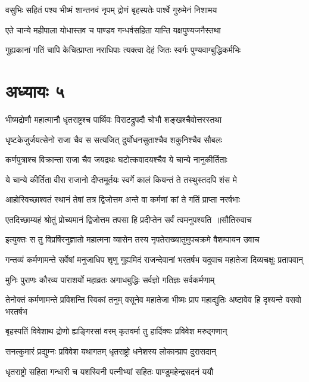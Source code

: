 \twolineshloka
{वसुभिः सहितं पश्य भीष्मं शान्तनवं नृपम्}
{द्रोणं बृहस्पतेः पार्श्वे गुरुमेनं निशामय}


\twolineshloka
{एते चान्ये महीपाला योधास्तव च पाण्डव}
{गन्धर्वसहिता यान्ति यक्षपुण्यजनैस्तथा}


\twolineshloka
{गुह्यकानां गतिं चापि केचित्प्राप्ता नराधिपाः}
{त्यक्त्वा देहं जितः स्वर्गः पुण्यवाग्बुद्धिकर्मभिः}


\chapter{अध्यायः ५}
\twolineshloka
{भीष्मद्रोणौ महात्मानौ धृतराष्ट्रश्च पार्थिवः}
{विराटद्रुपदौ चोभौ शङ्खश्चैवोत्तरस्तथा}


\twolineshloka
{धृष्टकेजुर्जयत्सेनो राजा चैव स सत्यजित्}
{दुर्योधनसुताश्चैव शकुनिश्चैव सौबलः}


\twolineshloka
{कर्णपुत्राश्च विक्रान्ता राजा चैव जयद्रथः}
{घटोत्कवादयश्चैव ये चान्ये नानुकीर्तिताः}


\twolineshloka
{ये चान्ये कीर्तिता वीरा राजानो दीप्तमूर्तयः}
{स्वर्गे कालं कियन्तं ते तस्थुस्तदपि शंस मे}


\twolineshloka
{आहोस्विच्छाश्वतं स्थानं तेषां तत्र द्विजोत्तम}
{अन्ते वा कर्मणां कां ते गतिं प्राप्ता नरर्षभाः}


\threelineshloka
{एतदिच्छाम्यहं श्रोतुं प्रोच्यमानं द्विजोत्तम}
{तपसा हि प्रदीप्तेन सर्वं त्वमनुपश्यति ॥सौतिरुवाच}
{}


\fourlineindentedshloka
{इत्युक्तः स तु विप्रर्षिरनुज्ञातो महात्मना}
{व्यासेन तस्य नृपतेराख्यातुमुपचक्रमे}
{वैशम्पायन उवाच}
{}


\threelineshloka
{गन्तव्यं कर्मणामन्ते सर्वेषां मनुजाधिप}
{शृणु गुह्यमिदं राजन्देवानां भरतर्षभ}
{यदुवाच महातेजा दिव्यचक्षुः प्रतापवान्}


\twolineshloka
{मुनिः पुराणः कौरव्य पाराशर्यो महाव्रतः}
{अगाधबुद्धिः सर्वज्ञो गतिज्ञः सर्वकर्मणाम्}


तेनोक्तं कर्मणामन्ते प्रविशन्ति स्विकां तनुम्
\twolineshloka
{वसूनेव महातेजा भीष्मः प्राप महाद्युतिः}
{अष्टावेव हि दृश्यन्ते वसवो भरतर्षभ}


\twolineshloka
{बृहस्पतिं विवेशाथ द्रोणो ह्यङ्गिरसां वरम्}
{कृतवर्मा तु हार्दिक्यः प्रविवेश मरुद्गणान्}


\twolineshloka
{सनत्कुमारं प्रद्युम्नः प्रविवेश यथागतम्}
{धृतराष्ट्रो धनेशस्य लोकान्प्राप दुरासदान्}


\twolineshloka
{धृतराष्ट्रो सहिता गन्धारी च यशस्विनी}
{पत्नीभ्यां सहितः पाण्डुमहेन्द्रसदनं ययौ}


